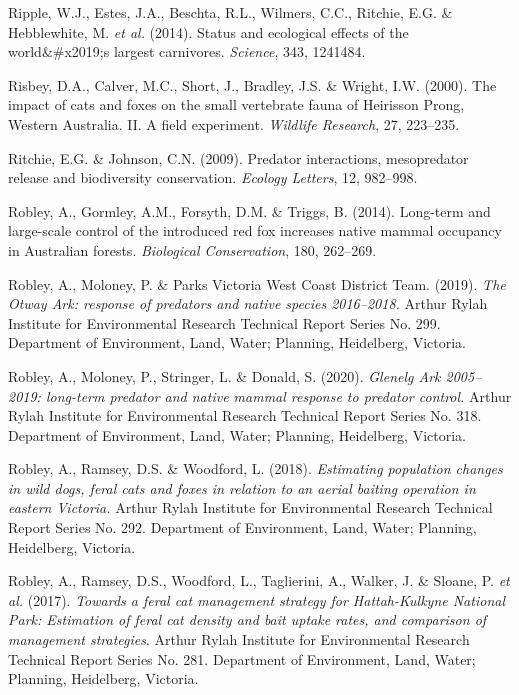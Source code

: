 \documentclass[11pt,a4paper,titlepage,twoside,openright]{style/unimelbthesis}
\begin{document}
\begin{mainmatter}
\leavevmode\hypertarget{ref-ripple2014status}{}%
Ripple, W.J., Estes, J.A., Beschta, R.L., Wilmers, C.C., Ritchie, E.G. \& Hebblewhite, M. \emph{et al.} (2014). Status and ecological effects of the world\&\#x2019;s largest carnivores. \emph{Science}, 343, 1241484.

\leavevmode\hypertarget{ref-risbey2000impacts}{}%
Risbey, D.A., Calver, M.C., Short, J., Bradley, J.S. \& Wright, I.W. (2000). The impact of cats and foxes on the small vertebrate fauna of Heirisson Prong, Western Australia. II. A field experiment. \emph{Wildlife Research}, 27, 223--235.

\leavevmode\hypertarget{ref-ritchie2009predator}{}%
Ritchie, E.G. \& Johnson, C.N. (2009). Predator interactions, mesopredator release and biodiversity conservation. \emph{Ecology Letters}, 12, 982--998.

\leavevmode\hypertarget{ref-robley2014long}{}%
Robley, A., Gormley, A.M., Forsyth, D.M. \& Triggs, B. (2014). Long-term and large-scale control of the introduced red fox increases native mammal occupancy in Australian forests. \emph{Biological Conservation}, 180, 262--269.

\leavevmode\hypertarget{ref-robley2019otway}{}%
Robley, A., Moloney, P. \& Parks Victoria West Coast District Team. (2019). \emph{The Otway Ark: response of predators and native species 2016--2018.} Arthur Rylah Institute for Environmental Research Technical Report Series No. 299. Department of Environment, Land, Water; Planning, Heidelberg, Victoria.

\leavevmode\hypertarget{ref-robley2020glenelg}{}%
Robley, A., Moloney, P., Stringer, L. \& Donald, S. (2020). \emph{Glenelg Ark 2005--2019: long-term predator and native mammal response to predator control.} Arthur Rylah Institute for Environmental Research Technical Report Series No. 318. Department of Environment, Land, Water; Planning, Heidelberg, Victoria.

\leavevmode\hypertarget{ref-robley2018estimating}{}%
Robley, A., Ramsey, D.S. \& Woodford, L. (2018). \emph{Estimating population changes in wild dogs, feral cats and foxes in relation to an aerial baiting operation in eastern Victoria.} Arthur Rylah Institute for Environmental Research Technical Report Series No. 292. Department of Environment, Land, Water; Planning, Heidelberg, Victoria.

\leavevmode\hypertarget{ref-robley2017towards}{}%
Robley, A., Ramsey, D.S., Woodford, L., Taglierini, A., Walker, J. \& Sloane, P. \emph{et al.} (2017). \emph{Towards a feral cat management strategy for Hattah-Kulkyne National Park: Estimation of feral cat density and bait uptake rates, and comparison of management strategies}. Arthur Rylah Institute for Environmental Research Technical Report Series No. 281. Department of Environment, Land, Water; Planning, Heidelberg, Victoria.


\end{mainmatter}
\end{document}
